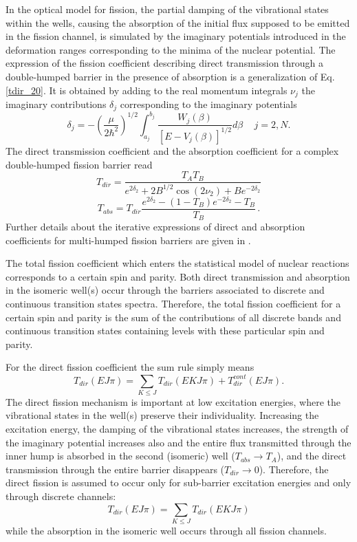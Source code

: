 In the optical model for fission, the partial damping of the vibrational
states within the wells, causing the absorption of the initial flux supposed
to be emitted in the fission channel, is simulated by the imaginary
potentials introduced in the deformation ranges corresponding to the minima
of the nuclear potential. The expression of the fission coefficient
describing direct transmission through a double-humped barrier in the
presence of absorption is a generalization of Eq.\ref{tdir_20}. It is
obtained by adding to the real momentum integrals $\nu_j$ the imaginary
contributions $\delta_j$ corresponding to the imaginary potentials \cite%
{Bhandari:79}
\begin{equation}
\delta_j=-\left( \frac{\mu}{2\hbar^{2}}\right) ^{1/2}\int_{a_{j}}^{b_{j}}%
\frac{W_j(\beta)}{[E-V_{j}(\beta)]^{1/2}}d\beta\,\quad j=2,N.
\end{equation}
The direct transmission coefficient and the absorption coefficient for a
complex double-humped fission barrier read
\begin{equation}
T_{dir}=\frac{T_{A}T_{B}}{e^{2\delta_2}+2B^{1/2}\cos
(2\nu_{2})+Be^{-2\delta_2}}  \label{tdir_2}
\end{equation}
\begin{equation}
T_{abs}=T_{dir}\frac{e^{2\delta_2}-(1-T_{B})e^{-2\delta_2}-T_{B}}{T_{B}}\,.
\label{tabs_2}
\end{equation}
Further details about the iterative expressions of direct and absorption
coefficients for multi-humped fission barriers are given in \cite{Sin:07}.

The total fission coefficient which enters the statistical model of nuclear
reactions corresponds to a certain spin and parity. Both direct transmission
and absorption in the isomeric well(s) occur through the barriers associated
to discrete and continuous transition states spectra. Therefore, the total
fission coefficient for a certain spin and parity is the sum of the
contributions of all discrete bands and continuous transition states
containing levels with these particular spin and parity.

For the direct fission coefficient the sum rule simply means
\begin{equation}
T_{dir}(EJ\pi)= \sum_{K\le J}T_{dir}(EKJ\pi)+ T_{dir}^{cont}(EJ\pi).
\end{equation}
The direct fission mechanism is important at low excitation energies, where
the vibrational states in the well(s) preserve their individuality.
Increasing the excitation energy, the damping of the vibrational states
increases, the strength of the imaginary potential increases also and the
entire flux transmitted through the inner hump is absorbed in the second
(isomeric) well ($T_{abs}\rightarrow T_{A}$), and the direct transmission
through the entire barrier disappears ($T_{dir}\rightarrow0$). Therefore,
the direct fission is assumed to occur only for sub-barrier excitation
energies and only through discrete channels:
\begin{equation}
T_{dir}(EJ\pi)=\sum_{K\le J}T_{dir}(EKJ\pi)  \label{tdirt}
\end{equation}
while the absorption in the isomeric well occurs through all fission
channels.

